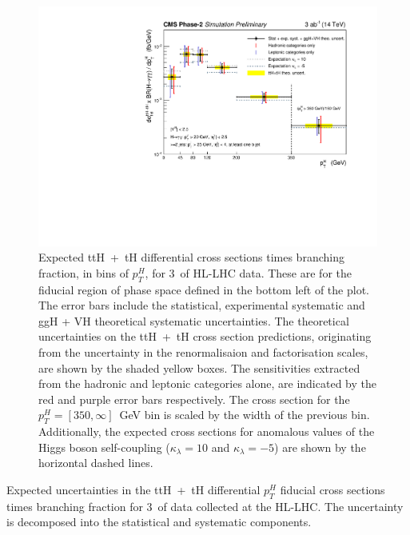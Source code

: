 \begin{figure}[t!]
  \centering
  \includegraphics[width=.8\textwidth]{Figures/cms/trilinear/CMS-PAS-FTR-18-020_Figure_006.pdf}
  \caption[Expected top-associated differential $p_T^H$ cross section measurements at the HL-LHC]
  {
    Expected ttH~+~tH differential cross sections times branching fraction, in bins of $p_T^H$, for 3~\abinv of HL-LHC data. These are for the fiducial region of phase space defined in the bottom left of the plot. The error bars include the statistical, experimental systematic and ggH + VH theoretical systematic uncertainties. The theoretical uncertainties on the ttH~+~tH cross section predictions, originating from the uncertainty in the renormalisaion and factorisation scales, are shown by the shaded yellow boxes. The sensitivities extracted from the hadronic and leptonic categories alone, are indicated by the red and purple error bars respectively. The cross section for the $p_T^H=[350,\infty]$~GeV bin is scaled by the width of the previous bin. Additionally, the expected cross sections for anomalous values of the Higgs boson self-coupling ($\kappa_\lambda=10$ and $\kappa_\lambda=-5$) are shown by the horizontal dashed lines.
  }
  \label{fig:trilinear_dxs}
\end{figure}

\begin{table}[b!]
  \centering
  \renewcommand{\arraystretch}{1.4}
  \setlength{\tabcolsep}{15pt}
  \caption[Expected sensitivities of top-associated differential cross sections at the HL-LHC]
  {
    Expected uncertainties in the ttH~+~tH differential $p_T^H$ fiducial cross sections times branching fraction for 3~\abinv of data collected at the HL-LHC. The uncertainty is decomposed into the statistical and systematic components.
  }
  \label{tab:trilinear_dxs_results}
  \hspace*{-1cm}
  
  \hspace*{-1cm}
\end{table}

